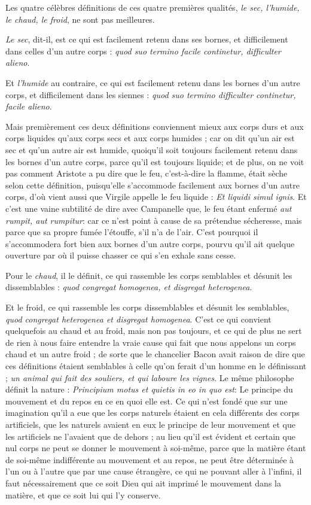 Les quatre célèbres définitions de ces quatre premières qualités, \emph{le sec, l'humide, le chaud, le froid}, ne sont pas meilleures.

\emph{Le sec}, dit-il, est ce qui est facilement retenu dans ses bornes, et difficilement dans celles d'un autre corps : \emph{quod suo termino facile continetur, difficulter alieno}.

Et \emph{l'humide} au contraire, ce qui est facilement retenu dans les bornes d'un autre corps, et difficilement dans les siennes : \emph{quod suo termino difficulter continetur, facile alieno}.

Mais premièrement ces deux définitions conviennent mieux aux corps durs et aux corps liquides qu'aux corps secs et aux corps humides ; car on dit qu'un air est sec et qu'un autre air est humide, quoiqu'il soit toujours facilement retenu dans les bornes d'un autre corps, parce qu'il est toujours liquide; et de plus, on ne voit pas comment Aristote a pu dire que le feu, c'est-à-dire la flamme, était sèche selon cette définition, puisqu'elle s'accommode facilement aux bornes d'un autre corps, d'où vient aussi que Virgile appelle le feu liquide : \emph{Et liquidi simul ignis}. Et c'est une vaine subtilité de dire avec Campanelle que, le feu étant enfermé \emph{aut rumpit, aut rumpitur}: car ce n'est point à cause de sa prétendue sécheresse, mais parce que sa propre fumée l'étouffe, s'il n'a de l'air. C'est pourquoi il s'accommodera fort bien aux bornes d'un autre corps, pourvu qu'il ait quelque ouverture par où il puisse chasser ce qui s'en exhale sans cesse.

Pour le \emph{chaud}, il le définit, ce qui rassemble les corps semblables et désunit les dissemblables : \emph{quod congregat homogenea, et disgregat heterogenea}.

Et le froid, ce qui rassemble les corps dissemblables et désunit les semblables, \emph{quod congregat heterogenea et disgregat homogenea}. C'est ce qui convient quelquefois au chaud et au froid, mais non pas toujours, et ce qui de plus ne sert de rien à nous faire entendre la vraie cause qui fait que nous appelons un corps chaud et un autre froid ; de sorte que le chancelier Bacon avait raison de dire que ces définitions étaient semblables à celle qu'on ferait d'un homme en le définissant ; \emph{un animal qui fait des souliers, et qui laboure les vignes}. Le même philosophe définit la nature : \emph{Principium motus et quietis in eo in quo est}: Le principe du mouvement et du repos en ce en quoi elle est. Ce qui n'est fondé que sur une imagination qu'il a eue que les corps naturels étaient en cela différents des corps artificiels, que les naturels avaient en eux le principe de leur mouvement et que les artificiels ne l'avaient que de dehors ; au lieu qu'il est évident et certain que nul corps ne peut se donner le mouvement à soi-même, parce que la matière étant de soi-même indifférente au mouvement et au repos, ne peut être déterminée à l'un ou à l'autre que par une cause étrangère, ce qui ne pouvant aller à l'infini, il faut nécessairement que ce soit Dieu qui ait imprimé le mouvement dans la matière, et que ce soit lui qui l'y conserve.

